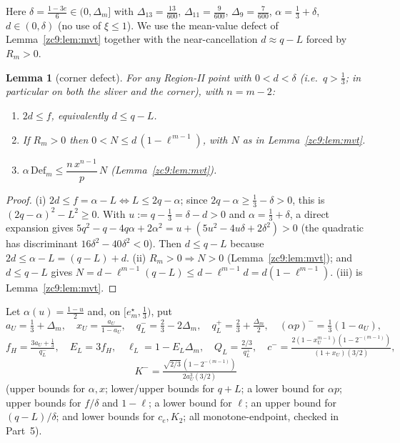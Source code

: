 \documentclass[11pt]{amsart}
\newtheorem{lemma}[theorem]{Lemma}
\newcommand{\Def}{\mathrm{Def}}
\begin{document}
Here $\delta=\tfrac{1-3e}6\in(0,\Delta_m]$ with
$\Delta_{13}=\tfrac{13}{600}$, $\Delta_{11}=\tfrac9{600}$,
$\Delta_9=\tfrac7{600}$, $\alpha=\tfrac13+\delta$, $d\in(0,\delta)$ (no use of
$\xi\le1$).  We use the mean-value defect of Lemma~\ref{zc9:lem:mvt} together
with the near-cancellation $d\approx q-L$ forced by $R_m>0$.

\begin{lemma}[corner defect]\label{zc9:lem:cornerN}
For any Region-II point with $0<d<\delta$ (i.e.\ $q>\tfrac13$; in particular on
both the sliver and the corner), with $n=m-2$:
\begin{enumerate}
\item[(i)] $2d\le f$, equivalently $d\le q-L$.
\item[(ii)] If $R_m>0$ then $0<N\le d\,(1-\ell^{\,m-1})$, with $N$ as in
 Lemma~\ref{zc9:lem:mvt}.
\item[(iii)] $\alpha\,\Def_m\le\dfrac{n\,x^{n-1}}p\,N$
 (Lemma~\ref{zc9:lem:mvt}).
\end{enumerate}
\end{lemma}

\begin{proof}
(i) $2d\le f=\alpha-L\iff L\le2q-\alpha$; since $2q-\alpha\ge\tfrac13-\delta>0$,
this is $(2q-\alpha)^2-L^2\ge0$.  With $u:=q-\tfrac13=\delta-d>0$ and
$\alpha=\tfrac13+\delta$, a direct expansion gives
$5q^2-q-4q\alpha+2\alpha^2=u+(5u^2-4u\delta+2\delta^2)>0$
(the quadratic has discriminant $16\delta^2-40\delta^2<0$).  Then $d\le q-L$
because $2d\le\alpha-L=(q-L)+d$.
(ii) $R_m>0\Rightarrow N>0$ (Lemma~\ref{zc9:lem:mvt}); and $d\le q-L$ gives
$N=d-\ell^{m-1}(q-L)\le d-\ell^{m-1}d=d(1-\ell^{m-1})$.
(iii) is Lemma~\ref{zc9:lem:mvt}.
\end{proof}

Let $\alpha(u)=\tfrac{1-u}2$ and, on $[e^\star_m,\tfrac13)$, put
\[
 a_U=\tfrac13+\Delta_m,\quad x_U=\tfrac{a_U}{1-a_U},\quad
 q_L^-=\tfrac23-2\Delta_m,\quad q_L^+=\tfrac23+\tfrac{\Delta_m}2,\quad
 (\alpha p)^-=\tfrac13(1-a_U),
\]
\[
 f_{\!H}=\tfrac{3a_U+\frac13}{q_L^-},\quad E_L=3f_{\!H},\quad
 \ell_L=1-E_L\Delta_m,\quad Q_L=\tfrac{2/3}{q_L^+},\quad
 c^-=\tfrac{2(1-x_U^{m-1})(1-2^{-(m-1)})}{(1+x_U)(3/2)},
\]
\[
 K^-=\tfrac{\sqrt{2/3}\,(1-2^{-(m-1)})}{2a_U^3(3/2)}
\]
(upper bounds for $\alpha,x$; lower/upper bounds for $q+L$; a lower bound for
$\alpha p$; upper bounds for $f/\delta$ and $1-\ell$; a lower bound for $\ell$;
an upper bound for $(q-L)/\delta$; and lower bounds for $c_e,K_2$;
all monotone-endpoint, checked in Part~5).
\end{document}

